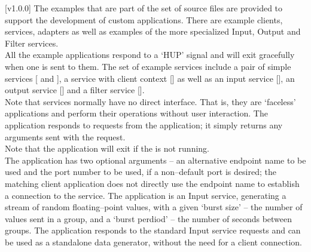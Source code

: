 [v1.0.0]
%
The examples that are part of the \mplusm{} set of source files are provided to support
the development of custom applications.
There are example clients, services, adapters as well as examples of the more specialized
Input, Output and Filter services.\\

All the example applications respond to a `HUP' signal and will exit gracefully when one
is sent to them.
The set of example services include a pair of simple services
[ and
], a service with client context
[] as well as an input service
[], an output service
[] and a filter service
[].\\

Note that services normally have no direct interface.
That is, they are `faceless' applications and perform their operations without user
interaction.
The  application responds to
 requests from the
 application; it simply returns any arguments
sent with the request.\\

Note that the application will exit if the
 is not running.\\

The application has two optional arguments -- an alternative endpoint name to be used and
the port number to be used, if a non--default port is desired; the matching client
application does not directly use the endpoint name to establish a connection to the
service.
The  application is an Input service,
generating a stream of random floating--point values, with a given `burst size' -- the
number of values sent in a group, and a `burst perdiod' -- the number of seconds between
groups.
The application responds to the standard Input service requests and can be used as a
standalone data generator, without the need for a client connection.\\

